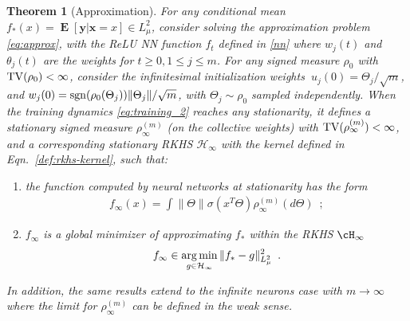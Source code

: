 \documentclass[11pt]{article}
\numberwithin{equation}{section}
\newtheorem{theorem}{Theorem}[section]
\def\E{\mathop{\mathbf{E}}}
\def\argmin{\operatornamewithlimits{arg\,min}}
\def\bd#1{\mathbf{#1}}
\def\bx{\bd{x}}
\def\by{\bd{y}}
\begin{document}
    \begin{theorem}[Approximation]
        \label{thm:proj-solution}
        For any conditional mean $f_*(x) = \E[\by|\bx =x] \in L^2_\mu$,
        consider solving the approximation problem \eqref{eq:approx}, with the ReLU NN function $f_t$ defined in \eqref{nn} where $w_j(t)$ and $\theta_j(t)$ are the weights for $t\geq 0, 1\leq j \leq m$. For any signed measure $\rho_0$ with ${\rm TV}(\rho_0) < \infty$, consider the infinitesimal initialization weights $\ u_j(0) = \Theta_j/\sqrt{m}$, and $w_j(0) = {\rm sgn}(\rho_0(\Theta_j)) \| \Theta_j \|/\sqrt{m}$, with $\Theta_j \sim \rho_0$ sampled independently. When the training dynamics \eqref{eq:training_2} reaches any stationarity, it defines a stationary signed measure $\rho^{(m)}_\infty$ (on the collective weights) with ${\rm TV}(\rho^{(m)}_\infty) < \infty$, and a corresponding stationary RKHS $\mathcal{H}_\infty$ with the kernel defined in Eqn.~\eqref{def:rkhs-kernel}, such that:
        \begin{enumerate}
            \item the function computed by neural networks at stationarity has the form
            \begin{align}
                \label{eq:infinite-sign-measure}
                f_{\infty}(x)  = \int \|\Theta\|\sigma(x^T\Theta)\rho^{(m)}_{\infty}(d\Theta) \enspace;
            \end{align}
            \item $f_{\infty}$ is a global minimizer of approximating $f_*$ within the RKHS $\cH_\infty$
            \begin{align}
                \label{eq:rkhs-proj}
                f_{\infty} \in \argmin_{g\in\mathcal{H}_\infty} \|f_* - g \|_{L^2_\mu}^2 \enspace.
            \end{align}
        \end{enumerate}
        In addition, the same results extend to the infinite neurons case with $m\rightarrow \infty$ where the limit for $\rho^{(m)}_\infty$ can be defined in the weak sense.
    \end{theorem}
    
\end{document}
